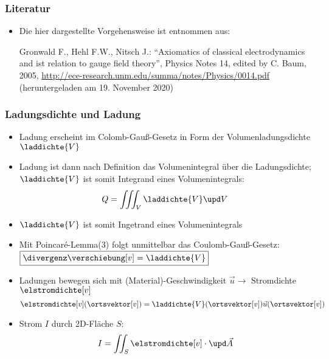 \begin{frame}
  \frametitle{Literatur}
\begin{itemize}[<+->]
\item Die hier dargestellte Vorgehensweise ist entnommen aus:
  \bigskip
  
  Gronwald F., Hehl F.W., Nitsch J.: \enquote{Axiomatics of classical electrodynamics and ist relation to gauge field theory}, Physics Notes 14, edited by C. Baum, 2005, \url{http://ece-research.unm.edu/summa/notes/Physics/0014.pdf} (heruntergeladen am 19. November 2020)
\end{itemize}
\end{frame}


\begin{frame}
  \frametitle{Ladungsdichte und Ladung}
\begin{itemize}[<+->]
\item Ladung erscheint im Colomb-Gauß-Gesetz in Form der Volumenladungsdichte \(\laddichte{V} \)
\item Ladung ist dann nach Definition das Volumenintegral über die Ladungsdichte; \(\laddichte{V} \) ist somit Integrand eines Volumenintegrals:
  \begin{equation*}
    Q = \iiint_V \laddichte{V} \upd V
  \end{equation*}
\item<0> \(\laddichte{V} \) ist somit Ingetrand eines Volumenintegrals
  \item<0> Mit Poincaré-Lemma(3) folgt unmittelbar das Coulomb-Gauß-Gesetz: \( \boxed{\divergenz\verschiebung[v] = \laddichte{V} }\)
  \item<0> Ladungen bewegen sich mit (Material)-Geschwindigkeit \(\vec{u} \to\) Stromdichte \(\elstromdichte[v]\)
    \begin{equation*}
\elstromdichte[v](\ortsvektor[v]) = \laddichte{V}(\ortsvektor[v])\vec{u}(\ortsvektor[v])
\end{equation*}
\item<0> Strom \(I\) durch 2D-Fläche \(S\):
  \begin{equation*}
    I = \iint_S \elstromdichte[v] \cdot \upd\vec{A}
    \end{equation*}

    
\end{itemize}
\end{frame}

